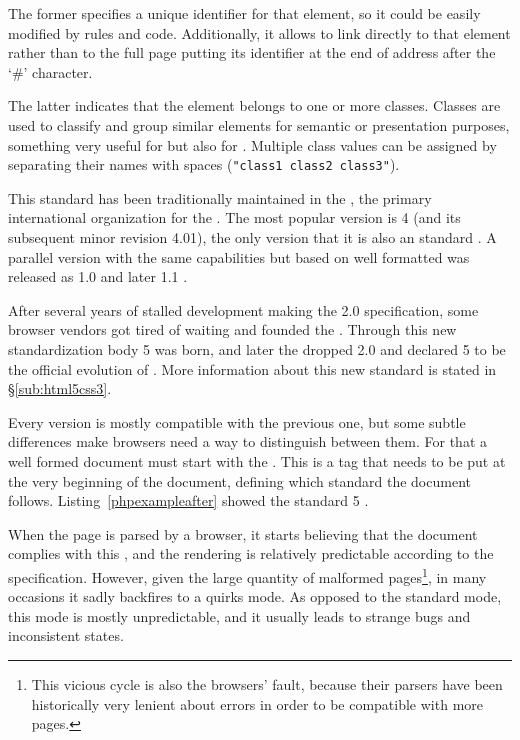 The former specifies a unique identifier for that element, so it could be easily modified by  rules and  code.
Additionally, it allows to link directly to that element rather than to the full page putting its identifier at the end of address after the `\#' character.

The latter indicates that the element belongs to one or more classes.
Classes are used to classify and group similar elements for semantic or presentation purposes, something very useful for  but also for .
Multiple class values can be assigned by separating their names with spaces (\texttt{"class1 class2 class3"}).

This standard has been traditionally maintained in the , the primary international organization for the .
The most popular version is  4 (and its subsequent minor revision  4.01), the only version that it is also an  standard  \cite{HTML4}.
A parallel version with the same capabilities but based on well formatted  was released as  1.0 and later  1.1  \cite{HTML4}.

After several years of stalled development making the  2.0 specification, some browser vendors got tired of waiting and founded the .
Through this new standardization body  5 was born, and later the  dropped  2.0 and declared  5 to be the official evolution of .
More information about this new standard is stated in \S\ref{sub:html5css3}.

Every version is mostly compatible with the previous one, but some subtle differences make browsers need a way to distinguish between them.
For that a well formed  document must start with the .
This is a tag that needs to be put at the very beginning of the document, defining which standard the document follows.
Listing~\vref{phpexampleafter} showed the standard  5 .

When the page is parsed by a browser, it starts believing that the document complies with this , and the rendering is relatively predictable according to the specification.
However, given the large quantity of malformed pages\footnote{This vicious cycle is also the browsers' fault, because their parsers have been historically very lenient about  errors in order to be compatible with more pages.}, in many occasions it sadly backfires to a quirks mode.
As opposed to the standard mode, this mode is mostly unpredictable, and it usually leads to strange bugs and inconsistent states.

